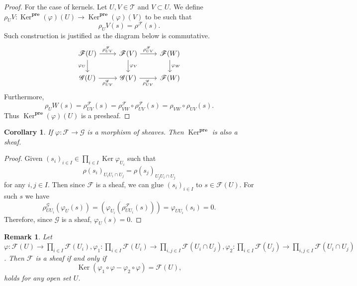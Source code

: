 \documentclass{article}
\newtheorem{remark}{Remark}[section]
\newtheorem{corollary}{Corollary}[section]
\numberwithin{equation}{section}
\DeclareMathOperator{\Ker}{Ker}
\begin{document}
\begin{proof}For the case of kernels.
Let $U,V\in\mathcal{T}$ and $V\subset U$. We define $\rho_UV: \Ker^{\mathbf{pre}}(\varphi)(U) \to\Ker^{\mathbf{pre}}(\varphi)(V)$ to be such that
\begin{equation*}
\rho_UV(s) = \rho^{\mathcal{F}}(s).
\end{equation*}
Such construction is justified as the diagram below is commutative.
\[
\begin{tikzcd}
\mathcal{F}(U) \arrow[r, "\rho^{\mathcal{F}}_{UV}"] \arrow[d, "\varphi_U"'] & \mathcal{F}(V) \arrow[d, "\varphi_V"] \arrow[r, "\rho^{\mathcal{F}}_{UV}"] & \mathcal{F}(W) \arrow[d, "\varphi_W"] \\
\mathcal{G}(U) \arrow[r, "\rho^{\mathcal{G}}_{UV}"']                        & \mathcal{G}(V) \arrow[r, "\rho^{\mathcal{G}}_{UV}"']                       & \mathcal{F}(W)                       
\end{tikzcd}
\]
Furthermore,
\begin{equation*}
\rho_UW(s) = \rho^{\mathcal{F}}_{UV}(s)=\rho^{\mathcal{F}}_{VW}\circ\rho^{\mathcal{F}}_{UV}(s) = \rho_{VW}\circ\rho_{UV}(s).
\end{equation*}
Thus $\Ker^{\mathbf{pre}}(\varphi)(U)$ is a presheaf.
\end{proof}

\begin{corollary}
If $\varphi:\mathcal{F}\to\mathcal{G}$ is a morphism of sheaves. Then $\Ker^{\mathbf{pre}}$ is also a sheaf.
\end{corollary}

\begin{proof}
Given $(s_i)_{i\in I}\in\prod_{i\in I}\Ker\varphi_{U_i}$ such that
\begin{equation*}
\rho(s_i)_{U_iU_i\cap U_j}=\rho(s_j)_{U_jU_i\cap U_j}
\end{equation*}
for any $i,j\in I$. Then since $\mathcal{F}$ is a sheaf, we can glue $(s_i)_{i\in I}$ to $s\in\mathcal{F}(U)$. For such $s$ we have
\begin{equation*}
\rho^{\mathcal{G}}_{UU_i}(\varphi_U(s)) = (\varphi_{U_i}(\rho^{\mathcal{F}}_{UU_i}(s))) = \varphi_{UU_i}(s_i) = 0.
\end{equation*}
Therefore, since $\mathcal{G}$ is a sheaf, $\varphi_U(s)=0$.
\end{proof}

\begin{remark}
Let $\varphi:\mathcal{F}(U)\to\prod_{i\in I}\mathcal{F}(U_i),\varphi_1:\prod_{i\in I}\mathcal{F}(U_i)\to\prod_{i,j\in I}\mathcal{F}(U_i\cap U_j),\varphi_2:\prod_{i\in I}\mathcal{F}(U_j)\to\prod_{i,j\in I}\mathcal{F}(U_i\cap U_j)$. Then $\mathcal{F}$ is a sheaf if and only if
\begin{equation*}
\Ker(\varphi_1\circ\varphi - \varphi_2\circ\varphi) = \mathcal{F}(U),
\end{equation*}
holds for any open set $U$.
\end{remark}
\end{document}

